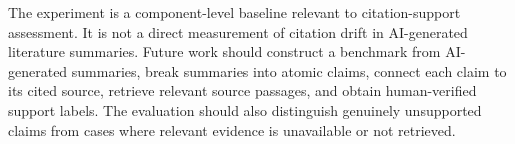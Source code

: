 \documentclass[conference]{IEEEtran}
\begin{document}
The experiment is a component-level baseline relevant to citation-support assessment. It is not a direct measurement of citation drift in AI-generated literature summaries. Future work should construct a benchmark from AI-generated summaries, break summaries into atomic claims, connect each claim to its cited source, retrieve relevant source passages, and obtain human-verified support labels. The evaluation should also distinguish genuinely unsupported claims from cases where relevant evidence is unavailable or not retrieved.



\end{document}

